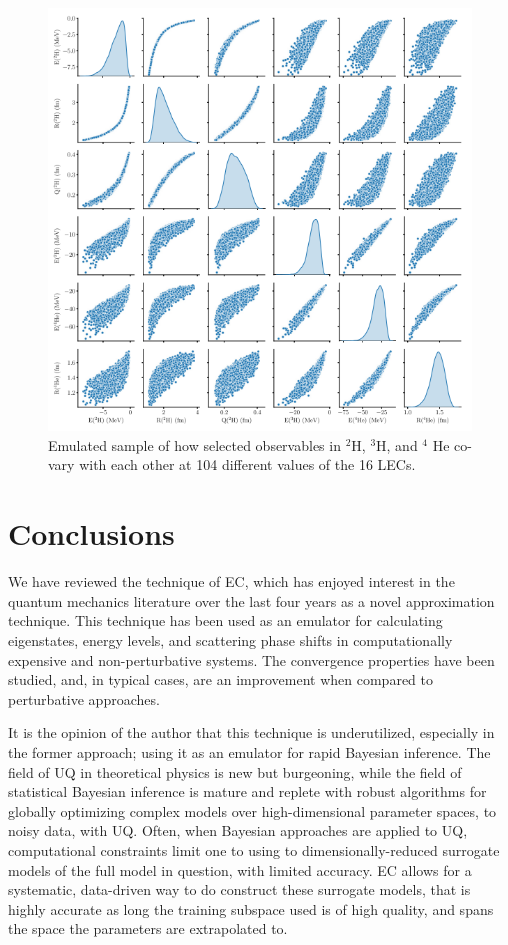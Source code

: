 \documentclass[%
 reprint,
 amsmath,amssymb,
 aps,
]{revtex4-2}
\begin{document}
\begin{figure}[b]
  \centering
  \includegraphics[width=1.0\linewidth]{./LEC_covar.png}
  \caption{Emulated sample of how selected observables in $^2$H, $^3$H, and $^4$ He co-vary with each other at 104 different values of the 16 LECs.}
\label{fig:cov}
\end{figure}


\section{\label{sec:appl} Conclusions}

We have reviewed the technique of \ac{EC}, which has enjoyed interest in the quantum mechanics literature over the last four years as a novel approximation technique. This technique has been used as an emulator for calculating eigenstates, energy levels, and scattering phase shifts in computationally expensive and non-perturbative systems. The convergence properties have been studied, and, in typical cases, are an improvement when compared to perturbative approaches.

It is the opinion of the author that this technique is underutilized, especially in the former approach; using it as an emulator for rapid Bayesian inference. The field of \ac{UQ} in theoretical physics is new but burgeoning, while the field of statistical Bayesian inference is mature and replete with robust algorithms for globally optimizing complex models over high-dimensional parameter spaces, to noisy data, with \ac{UQ}.
Often, when Bayesian approaches are applied to \ac{UQ}, computational constraints limit one to using to dimensionally-reduced surrogate models of the full model in question, with limited accuracy. \ac{EC} allows for a systematic, data-driven way to do construct these surrogate models, that is highly accurate as long the training subspace used is of high quality, and spans the space the parameters are extrapolated to. 
\end{document}
